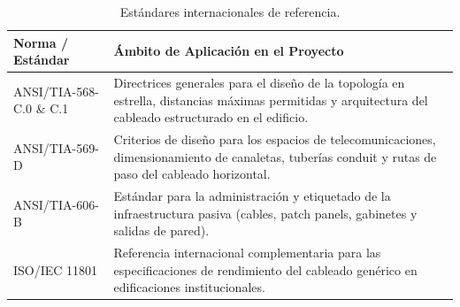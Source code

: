 \begin{table}[H]
\centering
\caption{Estándares internacionales de referencia.}
\begin{tabular}{lp{10cm}}
\hline
\textbf{Norma / Estándar} & \textbf{Ámbito de Aplicación en el Proyecto} \\
\hline
ANSI/TIA-568-C.0 \& C.1 & Directrices generales para el diseño de la topología en estrella, distancias máximas permitidas y arquitectura del cableado estructurado en el edificio. \\
%
ANSI/TIA-569-D & Criterios de diseño para los espacios de telecomunicaciones, dimensionamiento de canaletas, tuberías conduit y rutas de paso del cableado horizontal. \\
%
ANSI/TIA-606-B & Estándar para la administración y etiquetado de la infraestructura pasiva (cables, patch panels, gabinetes y salidas de pared). \\
%
ISO/IEC 11801 & Referencia internacional complementaria para las especificaciones de rendimiento del cableado genérico en edificaciones institucionales. \\
\hline
\end{tabular}
\end{table}
